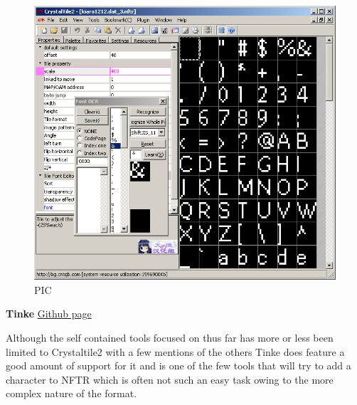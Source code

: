 \documentclass[
]{book}
\begin{document}
\begin{figure}
\centering
\includegraphics{images/114_home_fast6191_romhackingguide_unrenamed_fil___rders_romhackingguidefontnftrcrystaltile2_5.png}
\caption{PIC}
\end{figure}

\textbf{Tinke} \href{https://github.com/pleonex/tinke}{Github page}

Although the self contained tools focused on thus far has more or less been limited to Crystaltile2 with a few mentions of the others Tinke does feature a good amount of support for it and is one of the few tools that will try to add a character to NFTR which is often not such an easy task owing to the more complex nature of the format.
\end{document}
